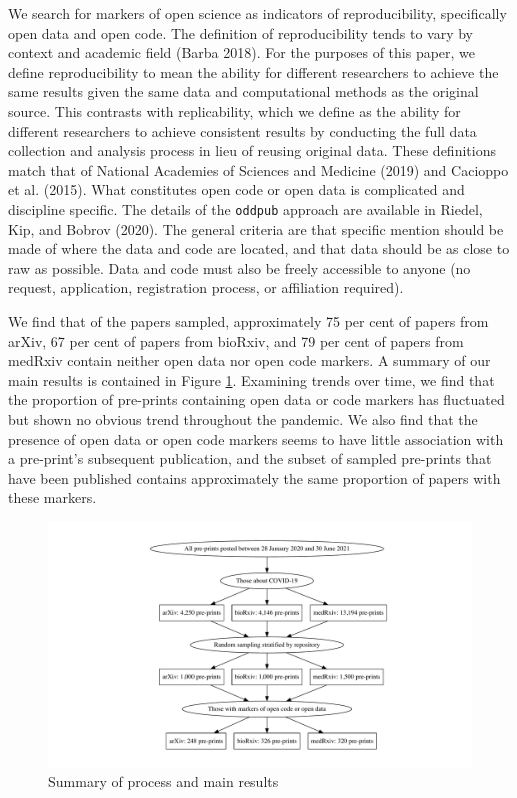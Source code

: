 \documentclass[
]{article}
\begin{document}
We search for markers of open science as indicators of reproducibility, specifically open data and open code. The definition of reproducibility tends to vary by context and academic field (Barba 2018). For the purposes of this paper, we define reproducibility to mean the ability for different researchers to achieve the same results given the same data and computational methods as the original source. This contrasts with replicability, which we define as the ability for different researchers to achieve consistent results by conducting the full data collection and analysis process in lieu of reusing original data. These definitions match that of National Academies of Sciences and Medicine (2019) and Cacioppo et al. (2015). What constitutes open code or open data is complicated and discipline specific. The details of the \texttt{oddpub} approach are available in Riedel, Kip, and Bobrov (2020). The general criteria are that specific mention should be made of where the data and code are located, and that data should be as close to raw as possible. Data and code must also be freely accessible to anyone (no request, application, registration process, or affiliation required).

We find that of the papers sampled, approximately 75 per cent of papers from arXiv, 67 per cent of papers from bioRxiv, and 79 per cent of papers from medRxiv contain neither open data nor open code markers. A summary of our main results is contained in Figure \ref{fig:flowchart}. Examining trends over time, we find that the proportion of pre-prints containing open data or code markers has fluctuated but shown no obvious trend throughout the pandemic. We also find that the presence of open data or open code markers seems to have little association with a pre-print's subsequent publication, and the subset of sampled pre-prints that have been published contains approximately the same proportion of papers with these markers.

\begin{figure}

{\centering \includegraphics[width=0.9\linewidth]{paper_files/figure-latex/flowchart-1} 

}

\caption{Summary of process and main results}\label{fig:flowchart}
\end{figure}
\end{document}
